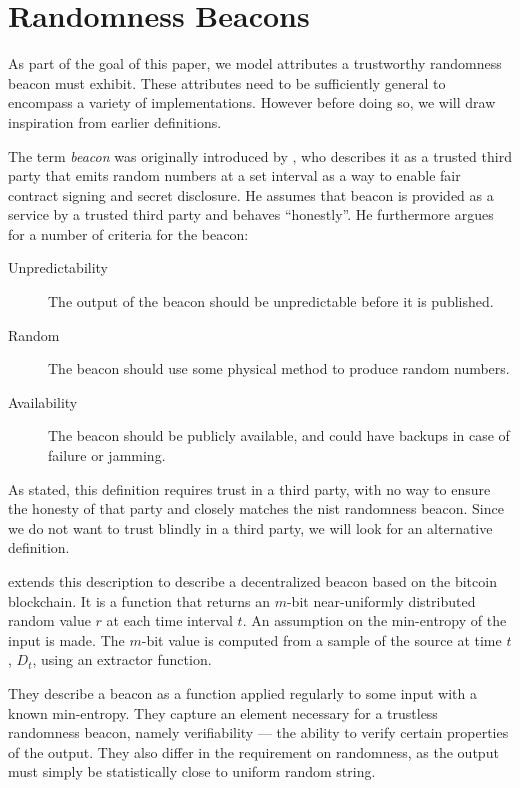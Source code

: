 \section{Randomness Beacons}\label{sec:beacons}

As part of the goal of this paper, we model attributes a trustworthy randomness beacon must exhibit. These attributes need to be sufficiently general to encompass a variety of implementations. However before doing so, we will draw inspiration from earlier definitions.

The term \emph{beacon} was originally introduced by \citet{rabin1983transaction}, who describes it as a trusted third party that emits random numbers at a set interval as a way to enable fair contract signing and secret disclosure.
He assumes that beacon is provided as a service by a trusted third party and behaves \enquote{honestly}. He furthermore argues for a number of criteria for the beacon:

\begin{description}
    \item[Unpredictability] The output of the beacon should be unpredictable before it is published.
    \item[Random] The beacon should use some physical method to produce random numbers.
    \item[Availability] The beacon should be publicly available, and could have backups in case of failure or jamming.
\end{description}

As stated, this definition requires trust in a third party, with no way to ensure the honesty of that party and closely matches the \gls{nist} randomness beacon.
Since we do not want to trust blindly in a third party, we will look for an alternative definition.

\citet{bonneau2015bitcoin} extends this description to describe a decentralized beacon based on the bitcoin blockchain.
It is a function that returns an $m$-bit near-uniformly distributed random value $r$ at each time interval $t$.
An assumption on the min-entropy of the input is made.
The $m$-bit value is computed from a sample of the source at time $t$, $D_t$, using an extractor function.

They describe a beacon as a function applied regularly to some input with a known min-entropy. They capture an element necessary for a trustless randomness beacon, namely verifiability --- the ability to verify certain properties of the output.
They also differ in the requirement on randomness, as the output must simply be statistically close to uniform random string.

